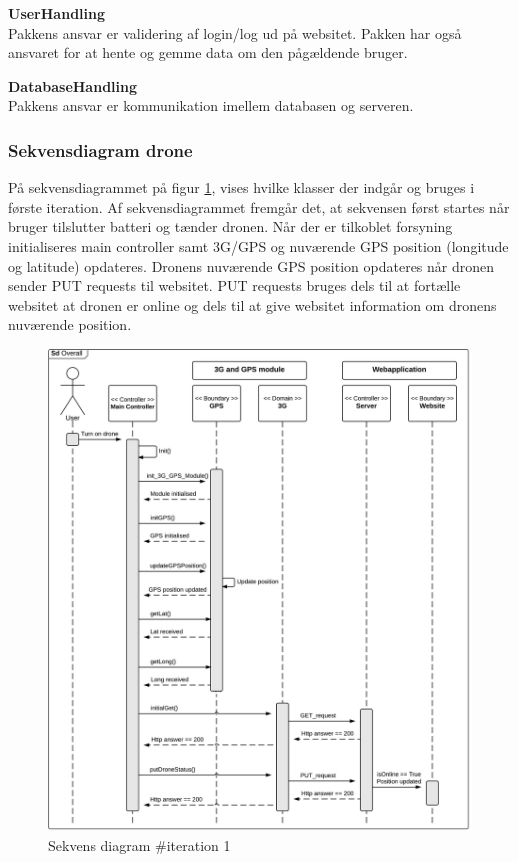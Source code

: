 \textbf{UserHandling}\\
Pakkens ansvar er validering af login/log ud på websitet. Pakken har også ansvaret for at hente og gemme data om den pågældende bruger.

\textbf{DatabaseHandling}\\
Pakkens ansvar er kommunikation imellem databasen og serveren. 


\newpage
\subsubsection*{Sekvensdiagram drone}
På sekvensdiagrammet på figur \ref{fig:Sekvens_diagram_iteration1}, vises hvilke klasser der indgår og bruges i første iteration. Af sekvensdiagrammet fremgår det, at sekvensen først startes når bruger tilslutter batteri og tænder dronen. Når der er tilkoblet forsyning initialiseres main controller samt 3G/GPS og nuværende GPS position  (longitude og latitude) opdateres. Dronens nuværende GPS position opdateres når dronen sender PUT requests til websitet. PUT requests bruges dels til at fortælle websitet at dronen er online og dels til at give websitet information om dronens nuværende position. 

\begin{figure}[H]
	\centering
	\includegraphics[width=1\textwidth]{Billeder/sekvens/sekvens_iteration1}
	\caption{Sekvens diagram \#iteration 1}
	\label{fig:Sekvens_diagram_iteration1}
\end{figure}
\newpage

